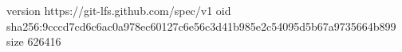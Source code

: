 version https://git-lfs.github.com/spec/v1
oid sha256:9cccd7cd6c6ac0a978ec60127c6e56c3d41b985e2c54095d5b67a9735664b899
size 626416
